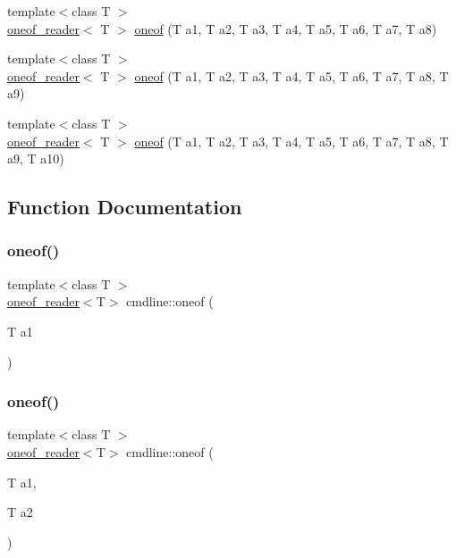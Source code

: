 \begin{DoxyCompactItemize}
\item 
{\footnotesize template$<$class T $>$ }\\\mbox{\hyperlink{structcmdline_1_1oneof__reader}{oneof\+\_\+reader}}$<$ T $>$ \mbox{\hyperlink{namespacecmdline_aeb59e9eaeea066b534633e5402180f4e}{oneof}} (T a1, T a2, T a3, T a4, T a5, T a6, T a7, T a8)
\item 
{\footnotesize template$<$class T $>$ }\\\mbox{\hyperlink{structcmdline_1_1oneof__reader}{oneof\+\_\+reader}}$<$ T $>$ \mbox{\hyperlink{namespacecmdline_ad4667b21857606deef99cb73dc190130}{oneof}} (T a1, T a2, T a3, T a4, T a5, T a6, T a7, T a8, T a9)
\item 
{\footnotesize template$<$class T $>$ }\\\mbox{\hyperlink{structcmdline_1_1oneof__reader}{oneof\+\_\+reader}}$<$ T $>$ \mbox{\hyperlink{namespacecmdline_a65cb207a728dad2d786fd4bd97232c11}{oneof}} (T a1, T a2, T a3, T a4, T a5, T a6, T a7, T a8, T a9, T a10)
\end{DoxyCompactItemize}


\subsection{Function Documentation}
\mbox{\label{namespacecmdline_aec34ff037ea9002323a2b656e1c49f93}} 
\subsubsection{\texorpdfstring{oneof()}{oneof()}\hspace{0.1cm}{\footnotesize\ttfamily [1/10]}}
{\footnotesize\ttfamily template$<$class T $>$ \\
\mbox{\hyperlink{structcmdline_1_1oneof__reader}{oneof\+\_\+reader}}$<$T$>$ cmdline\+::oneof (\begin{DoxyParamCaption}\item[{T}]{a1 }\end{DoxyParamCaption})}

\mbox{\label{namespacecmdline_a197fdd07b0735c1c7382bfa4d3e1e884}} 
\subsubsection{\texorpdfstring{oneof()}{oneof()}\hspace{0.1cm}{\footnotesize\ttfamily [2/10]}}
{\footnotesize\ttfamily template$<$class T $>$ \\
\mbox{\hyperlink{structcmdline_1_1oneof__reader}{oneof\+\_\+reader}}$<$T$>$ cmdline\+::oneof (\begin{DoxyParamCaption}\item[{T}]{a1,  }\item[{T}]{a2 }\end{DoxyParamCaption})}

